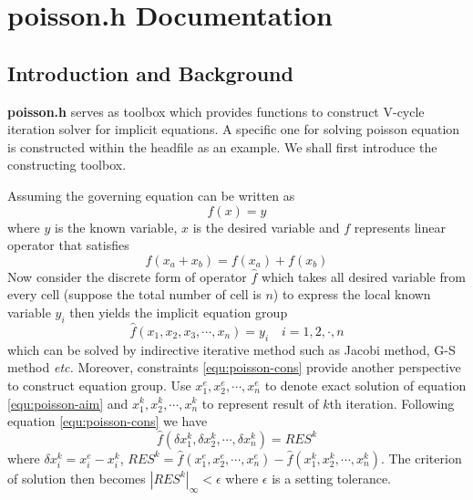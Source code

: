 \chapter{poisson.h Documentation}
\ifsingle
\maketitle
\fi
\chaptermeta[1.0][2025-06-07]

\section{Introduction and Background}\label{sec:poisson-intro}
\textbf{poisson.h} serves as toolbox which provides functions to construct V-cycle iteration solver for implicit equations. A specific one for solving poisson equation is constructed within the headfile as an example. We shall first introduce the constructing toolbox.\par
Assuming the governing equation can be written as
\begin{equation}
  f( x) = y
\end{equation}
where $y$ is the known variable, $ x$ is the desired variable and $f$ represents linear operator that satisfies
\begin{equation}\label{equ:poisson-cons}
  f( x_a+ x_b) = f( x_a) + f( x_b)
\end{equation}
Now consider the discrete form of operator $\hat{f}$ which takes all desired variable from every cell (suppose the total number of cell is $n$) to express the local known variable $y_i$ then yields the implicit equation group
\begin{equation}\label{equ:poisson-aim}
  \hat{f}(x_1,x_2,x_3,\cdots,x_n) = y_i \quad i = 1,2,\cdot,n
\end{equation}
which can be solved by indirective iterative method such as Jacobi method, G-S method\cite{2010_Moin} \emph{etc.} Moreover, constraints \ref{equ:poisson-cons} provide another perspective to construct equation group. Use $x_1^e,x_2^e,\cdots,x_n^e$ to denote exact solution of equation \ref{equ:poisson-aim} and $x_1^k,x_2^k,\cdots,x_n^k$ to represent result of $k$th iteration. Following equation \ref{equ:poisson-cons} we have
\begin{equation}\label{equ:poisson-iter}
  \hat{f}(\delta x_1^k,\delta x_2^k,\cdots, \delta x_n^k) = RES^k
\end{equation}
where $\delta x_i^k = x_i^e - x_i^k$, $RES^k = \hat{f}(x_1^e,x_2^e,\cdots,x_n^e) - \hat{f}(x_1^k,x_2^k,\cdots,x_n^k)$. The criterion of solution then becomes $|RES^k|_{\infty}<\epsilon$ where $\epsilon$ is a setting tolerance.\par
